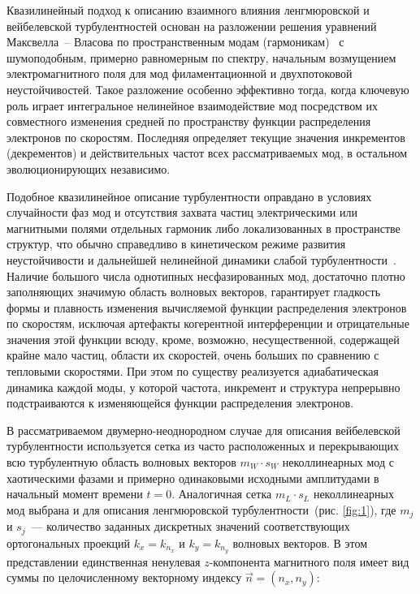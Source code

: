 Квазилинейный подход к описанию взаимного влияния ленгмюровской и вейбелевской турбулентностей основан на разложении решения уравнений Максвелла~-- Власова по пространственным модам (гармоникам)~\cite{Baumjohann2012} с шумоподобным, примерно равномерным по спектру, начальным возмущением электромагнитного поля для мод филаментационной и двухпотоковой неустойчивостей. Такое разложение особенно эффективно тогда, когда ключевую роль играет интегральное нелинейное взаимодействие мод посредством их совместного изменения средней по пространству функции распределения электронов по скоростям. Последняя определяет текущие значения инкрементов (декрементов) и действительных частот всех рассматриваемых мод, в остальном эволюционирующих независимо.

Подобное квазилинейное описание турбулентности оправдано в условиях случайности фаз мод и отсутствия захвата частиц электрическими или магнитными полями отдельных гармоник либо локализованных в пространстве структур, что обычно справедливо в кинетическом режиме развития неустойчивости и дальнейшей нелинейной динамики слабой турбулентности~\cite{GaleevSagdeev1969,VedenovRyutov1975,Bakunin2017,Kuznetsov2023}. Наличие большого числа однотипных несфазированных мод, достаточно плотно заполняющих значимую область волновых векторов, гарантирует гладкость формы и плавность изменения вычисляемой функции распределения электронов по скоростям, исключая артефакты когерентной интерференции и отрицательные значения этой функции всюду, кроме, возможно, несущественной, содержащей крайне мало частиц, области их скоростей, очень больших по сравнению с тепловыми скоростями. При этом по существу реализуется адиабатическая динамика каждой моды, у которой частота, инкремент и структура непрерывно подстраиваются к изменяющейся функции распределения электронов. 

В рассматриваемом двумерно-неоднородном случае для описания вейбелевской турбулентности используется сетка из часто расположенных и перекрывающих всю турбулентную область волновых векторов $m_W \cdot s_W$ неколлинеарных мод с хаотическими фазами и примерно одинаковыми исходными амплитудами в начальный момент времени $t=0$. Аналогичная сетка $m_L \cdot s_L$ неколлинеарных мод выбрана и для описания ленгмюровской турбулентности~(рис. \ref{fig:1}), где $m_j$ и $s_j$~--- количество заданных дискретных значений соответствующих ортогональных проекций $k_x=k_{n_x}$ и $k_y=k_{n_y}$ волновых векторов. В этом представлении единственная ненулевая $z$-компонента магнитного поля имеет вид суммы по целочисленному векторному индексу $\vec{n}=(n_x,n_y)$:


